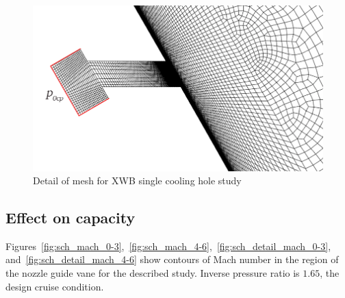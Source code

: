 \documentclass[a4paper, 11pt, oneside]{report}
\begin{document}
\begin{figure}[H]
      \centering
      \includegraphics[width=.60\textwidth]{figs/SCH_mesh_hole.png}
      \caption{Detail of mesh for XWB single cooling hole study}
      \label{fig:SCH_mesh}
\end{figure}

\newpage
\subsection{Effect on capacity}

Figures~\ref{fig:sch_mach_0-3},~\ref{fig:sch_mach_4-6},~\ref{fig:sch_detail_mach_0-3}, and~\ref{fig:sch_detail_mach_4-6} show contours of Mach number in the region of the nozzle guide vane for the described study. Inverse pressure ratio is $1.65$, the design cruise condition.
\end{document}

